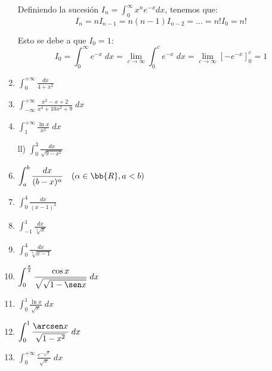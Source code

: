 \begin{ejercicio}
\begin{enumerate}
        Definiendo la sucesión $\displaystyle I_n=\int_0^{\infty} x^n e^{-x}dx$, tenemos que:
        \begin{equation*}
            I_n = nI_{n-1} = n(n-1)I_{n-2} = \dots = n!I_0 = n!
        \end{equation*}
            
        Esto se debe a que $I_0 = 1$:
        \begin{equation*}
            I_0 = \int_0^\infty e^{-x}\;dx
            =\lim_{c\to \infty} \int_0^c e^{-x}\;dx
            =\lim_{c\to \infty} \left[-e^{-x}\right]_0^c = 1
        \end{equation*}

    
    \item $\displaystyle \int_{0}^{+\infty} \frac{dx}{4+x^2}$
    \item $\displaystyle \int_{-\infty}^{+\infty} \frac{x^2-x+2}{x^4+10x^2+9}\;dx$
    \item $\displaystyle \int_{1}^{+\infty} \frac{\ln x}{x^2}\;dx$
    \item[ll)] $\displaystyle \int_{0}^3 \frac{dx}{\sqrt{9-x^2}}$
    \item $\displaystyle \int_{a}^{b} \frac{dx}{(b-x)^\alpha}\quad (\alpha\in \bb{R}, a<b)$
    \item $\displaystyle \int_{0}^{4} \frac{dx}{(x-1)^2}$
    \item $\displaystyle \int_{-1}^{1} \frac{dx}{\sqrt[3]{x}}$
    \item $\displaystyle \int_{0}^{4} \frac{dx}{\sqrt[3]{x-1}}$
    \item $\displaystyle \int_{0}^{\frac{\pi}{2}} \frac{\cos x}{\sqrt{\sqrt{1-\sen x}}}\;dx$
    \item $\displaystyle \int_{0}^{1} \frac{\ln x}{\sqrt{x}}\;dx$
    \item $\displaystyle \int_{0}^{1} \frac{\arcsen x}{\sqrt{1-x^2}}\;dx$
    \item $\displaystyle \int_{0}^{+\infty} \frac{e^{-\sqrt{x}}}{\sqrt{x}}\;dx$
    
\end{enumerate}
\end{ejercicio}

